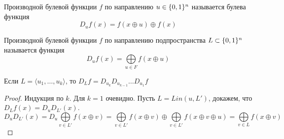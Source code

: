 \begin{definition}
Производной булевой функции $f$ по направлению $u \in \{0,1\}^n$ называется
булева функция $$D_u f (x) = f(x \oplus u) \oplus f(x)$$
\end{definition}

\begin{definition}
Производной булевой функции $f$ по направлению подпространства $L \subset \{0,1\}^n$
называется функция
$$D_u f (x) = \bigoplus\limits_{u \in F} f(x \oplus u)$$

\end{definition}

\begin{remark}
Если $L = \langle u_1, \ldots, u_k \rangle$, то $D_L f = D_{u_k} D_{u_{k-1}} \ldots D_{u_1} f$
\end{remark}
\begin{proof}
Индукция по $k$. Для $k=1$ очевидно. Пусть $L = Lin (u, L')$,
докажем, что $D_L f (x) = D_u D_{L'} (x)$.
\[
D_u D_{L'} (x) = D_u \bigoplus\limits_{v \in L'} f(x \oplus v) = 
\bigoplus\limits_{v \in L'} f(x \oplus v) \oplus \bigoplus\limits_{v \in L'} f(x \oplus v \oplus u) 
= \bigoplus\limits_{v \in L} f(x \oplus v)
\]
\end{proof}

